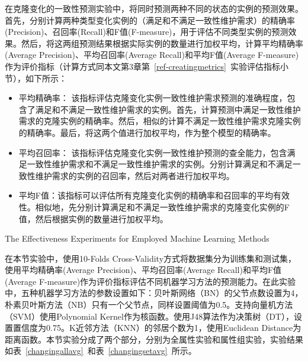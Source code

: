 在克隆变化的一致性预测实验中，将同时预测两种不同的状态的实例的预测效果。首先，分别计算两种类型变化实例的（满足和不满足一致性维护需求）的精确率(Precision)、召回率(Recall)和F值(F-measure)，用于评估不同类型实例的预测效果。然后，将这两组预测结果根据实际实例的数量进行加权平均，计算平均精确率(Average Precision)、平均召回率(Average Recall)和平均F值(Average F-measure)作为评价指标（计算方式同本文第3章第~\ref{ref-creatingmetrics}~实验评估指标小节），如下所示：

\begin{itemize}
\item
平均精确率： 该指标评估克隆变化实例一致性维护需求预测的准确程度，包含了满足和不满足一致性维护需求的实例。首先，计算预测中满足一致性维护需求的克隆实例的精确率。然后，相似的计算不满足一致性维护需求克隆实例的精确率。最后，将这两个值进行加权平均，作为整个模型的精确率。
\item
平均召回率： 该指标评估克隆变化实例一致性维护预测的查全能力，包含满足一致性维护需求和不满足一致性维护需求的实例。分别计算满足和不满足一致性维护需求的实例的召回率，然后对两者进行加权平均。
\item
平均F值：该指标可以评估所有克隆变化实例的精确率和召回率的平均有效性。相似地，先分别计算满足和不满足一致性维护需求的克隆变化实例的F值，然后根据实例的数量进行加权平均。
\end{itemize}

{The Effectiveness Experiments for Employed Machine Learning Methods}

在本节实验中，使用10-Folds Cross-Validity方式将数据集分为训练集和测试集，使用平均精确率(Average Precision)、平均召回率(Average Recall)和平均F值(Average F-measure)作为评价指标评估不同机器学习方法的预测能力。在此实验中，五种机器学习方法的参数设置如下：贝叶斯网络（BN）的父节点数设置为4， 朴素贝叶斯方法（NB）只有一个父节点，同样设置阈值为0.5。支持向量机方法（SVM）使用{Polynomial Kernel}作为核函数。使用J48算法作为决策树（DT），设置置信度为0.75。K近邻方法（KNN）的邻居个数为1，使用{Euclidean Distance}为距离函数。本节实验分成了两个部分，分别为全属性实验和属性组实验，实验结果如表~\ref{changingallavg}~和表~\ref{changingsetavg}~所示。

